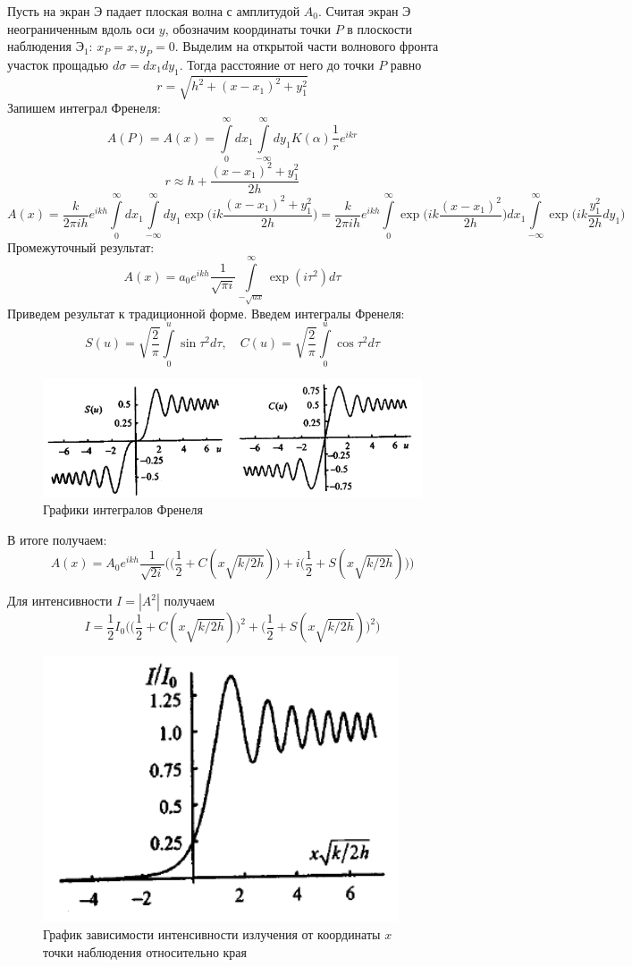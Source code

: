 \documentclass[a4paper,12pt]{article}
\begin{document}
Пусть на экран Э падает плоская волна с амплитудой $A_0$. Считая экран Э неограниченным вдоль оси $y$, обозначим координаты точки $P$ в плоскости наблюдения $\text{Э}_1$: $x_P=x, y_P=0$. Выделим на открытой части волнового фронта участок прощадью $d\sigma=dx_1dy_1$. Тогда расстояние от него до точки $P$ равно
$$
r = \sqrt{h^2+(x-x_1)^2+y_1^2}
$$
Запишем интеграл Френеля:
$$
A(P) = A(x)=\int\limits_0^\infty dx_1\int\limits_{-\infty}^\infty dy_1K(\alpha)\frac{1}{r}e^{ikr}
$$
$$
r\approx h+\frac{(x-x_1)^2+y_1^2}{2h}
$$
$$
A(x) = \frac{k}{2\pi ih}e^{ikh}\int\limits_0^\infty dx_1\int\limits_{-\infty}^\infty dy_1\exp{\Big(ik\frac{(x-x_1)^2+y_1^2}{2h} \Big)}=\frac{k}{2\pi ih}e^{ikh}\int\limits_0^\infty\exp{\Big(ik\frac{(x-x_1)^2}{2h} \Big)}dx_1\int\limits_{-\infty}^\infty\exp{\Big(ik\frac{y_1^2}{2h}dy_1 \Big)}
$$
Промежуточный результат:
$$
A(x) =a_0e^{ikh}\frac{1}{\sqrt{\pi i}}\int\limits_{-\sqrt{ax}}^\infty\exp{(i\tau^2)d\tau}
$$
Приведем результат к традиционной форме. Введем интегралы Френеля:
$$
S(u)=\sqrt{\frac{2}{\pi}}\int\limits_0^u\sin{\tau^2} d\tau, \quad C(u)=\sqrt{\frac{2}{\pi}}\int\limits_0^u \cos{\tau^2} d\tau
$$

\begin{figure}[h]
\centering
\includegraphics[width=0.4\linewidth]{img9.png}
\caption{Графики интегралов Френеля}
\label{img9}
\end{figure}

В итоге получаем:
$$
A(x)=A_0e^{ikh}\frac{1}{\sqrt{2i}}\Bigg(\Big(\frac{1}{2}+C(x\sqrt{k/2h})\Big)+i\Big(\frac{1}{2}+S(x\sqrt{k/2h})\Big)\Bigg)
$$

Для интенсивности $I=|A^2|$ получаем
$$
I = \frac{1}{2}I_0\Bigg(\Big(\frac{1}{2}+C(x\sqrt{k/2h})\Big)^2+\Big(\frac{1}{2}+S(x\sqrt{k/2h}) \Big)^2\Bigg)
$$

\begin{figure}[h]
\centering
\includegraphics[width=0.4\linewidth]{img10.png}
\caption{График зависимости интенсивности излучения от координаты $x$ точки наблюдения относительно края}
\label{img10}
\end{figure}
\end{document}
